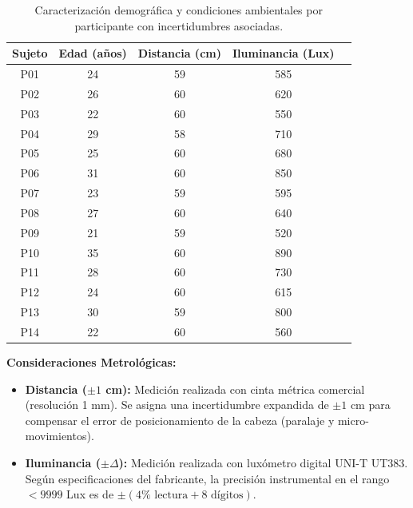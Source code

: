 \begin{table}[H]
	\centering
	\caption[Caracterización demográfica y condiciones por participante.]{Caracterización demográfica y condiciones ambientales por participante con incertidumbres asociadas.}
	\vspace{0.2cm}
	\begin{tabular}{ccccc}
		\toprule
		\textbf{Sujeto} & \textbf{Edad (años)} & \textbf{Distancia (cm)} & \textbf{Iluminancia (Lux)} \\
		\midrule
		P01 & 24 & 59 & 585 \\
		P02 & 26  & 60 & 620 \\
		P03 & 22 & 60 & 550 \\
		P04 & 29  & 58 & 710 \\
		P05 & 25 & 60 & 680 \\
		P06 & 31  & 60 & 850 \\
		P07 & 23  & 59 & 595 \\
		P08 & 27  & 60 & 640 \\
		P09 & 21 & 59 & 520 \\
		P10 & 35 & 60 & 890 \\
		P11 & 28  & 60 & 730 \\
		P12 & 24 & 60 & 615 \\
		P13 & 30  & 59 & 800 \\
		P14 & 22  & 60 & 560 \\
		\bottomrule
	\end{tabular}
	\label{tab:participantes_detalle}
	\vspace{0.2cm}
	\begin{minipage}{0.9\textwidth}
		\footnotesize
		\textbf{Consideraciones Metrológicas:}
		\begin{itemize}
			\item \textbf{Distancia ($\pm 1$ cm):} Medición realizada con cinta métrica comercial (resolución 1 mm).
			Se asigna una incertidumbre expandida de $\pm 1$ cm para compensar el error de posicionamiento de la cabeza (paralaje y micro-movimientos).
			\item \textbf{Iluminancia ($\pm \Delta$):} Medición realizada con luxómetro digital UNI-T UT383.
			Según especificaciones del fabricante, la precisión instrumental en el rango $<9999$ Lux es de $\pm(4\% \text{ lectura} + 8 \text{ dígitos})$.
		\end{itemize}
	\end{minipage}
\end{table}



